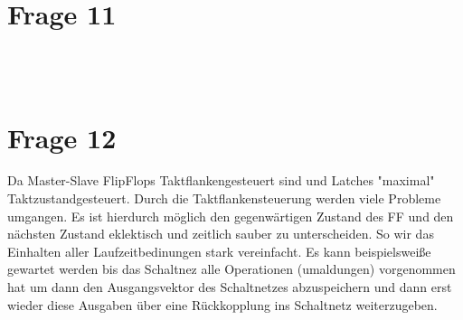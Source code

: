 \documentclass[a4paper]{scrartcl}
\begin{document}
\section*{Frage 11}

~\\
~\\
\section*{Frage 12}
Da Master-Slave FlipFlops Taktflankengesteuert sind und Latches "maximal" Taktzustandgesteuert. Durch die Taktflankensteuerung werden viele Probleme umgangen. Es ist hierdurch möglich den gegenwärtigen Zustand des FF und den nächsten Zustand eklektisch und zeitlich sauber zu unterscheiden. So wir das Einhalten aller Laufzeitbedinungen stark vereinfacht. Es kann beispielsweiße gewartet werden bis das Schaltnez alle Operationen (umaldungen) vorgenommen hat um dann den Ausgangsvektor des Schaltnetzes abzuspeichern und dann erst wieder diese Ausgaben über eine Rückkopplung ins Schaltnetz weiterzugeben.
~\\
~\\
\end{document}
